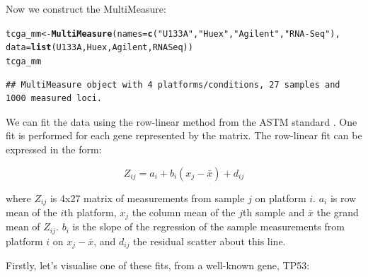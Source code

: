\documentclass{article}\usepackage[]{graphicx}\usepackage[]{color}
\makeatletter
\newcommand{\hlstr}[1]{\textcolor[rgb]{0.192,0.494,0.8}{#1}}%
\newcommand{\hlstd}[1]{\textcolor[rgb]{0.345,0.345,0.345}{#1}}%
\newcommand{\hlkwb}[1]{\textcolor[rgb]{0.69,0.353,0.396}{#1}}%
\newcommand{\hlkwc}[1]{\textcolor[rgb]{0.333,0.667,0.333}{#1}}%
\newcommand{\hlkwd}[1]{\textcolor[rgb]{0.737,0.353,0.396}{\textbf{#1}}}%
\newenvironment{kframe}{%
 \def\at@end@of@kframe{}%
 \ifinner\ifhmode%
  \def\at@end@of@kframe{\end{minipage}}%
  \begin{minipage}{\columnwidth}%
 \fi\fi%
 \def\FrameCommand##1{\hskip\@totalleftmargin \hskip-\fboxsep
 \colorbox{shadecolor}{##1}\hskip-\fboxsep
     \hskip-\linewidth \hskip-\@totalleftmargin \hskip\columnwidth}%
 \MakeFramed {\advance\hsize-\width
   \@totalleftmargin\z@ \linewidth\hsize
   \@setminipage}}%
 {\par\unskip\endMakeFramed%
 \at@end@of@kframe}
\newenvironment{knitrout}{}{} %
\makeatother
\begin{document}
Now we construct the MultiMeasure:

\begin{knitrout}
\color{fgcolor}\begin{kframe}
\begin{alltt}
\hlstd{tcga_mm} \hlkwb{<-} \hlkwd{MultiMeasure}\hlstd{(}\hlkwc{names}\hlstd{=}\hlkwd{c}\hlstd{(}\hlstr{"U133A"}\hlstd{,} \hlstr{"Huex"}\hlstd{,} \hlstr{"Agilent"}\hlstd{,} \hlstr{"RNA-Seq"}\hlstd{),}
                        \hlkwc{data}\hlstd{=}\hlkwd{list}\hlstd{(U133A, Huex, Agilent, RNASeq))}
\hlstd{tcga_mm}
\end{alltt}
\begin{verbatim}
## MultiMeasure object with 4 platforms/conditions, 27 samples and 1000 measured loci.
\end{verbatim}
\end{kframe}
\end{knitrout}

We can fit the data using the row-linear method from the ASTM standard \cite{Mandel}. One fit is performed for each gene represented by the matrix. The row-linear fit can be expressed in the form: 

\begin{equation}
Z_{ij} = a_{i} + b_{i}(x_{j} - \bar{x}) + d_{ij}
\end{equation}

where $Z_{ij}$ is 4x27 matrix of measurements from sample $j$ on platform $i$. $a_i$ is row mean of the $i$th platform, $x_j$ the column mean of the $j$th sample and $\bar{x}$ the grand mean of $Z_{ij}$. $b_i$ is the slope of the regression of the sample measurements from platform $i$ on $x_j - \bar{x}$, and $d_{ij}$ the residual scatter about this line.

Firstly, let's visualise one of these fits, from a well-known gene, TP53:
\end{document}
